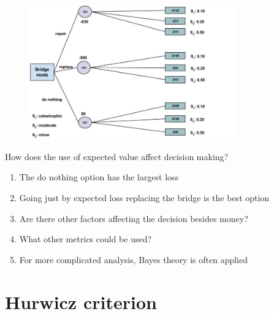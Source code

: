 \documentclass[aspectratio=1610,pdftex,dvipsnames,compress,xcolor={dvipsnames}]{beamer}
\begin{document}
\addtocounter{framenumber}{-1}
\begin{frame}{}
    \begin{figure}
        \centering
        \includegraphics[width=0.80\textwidth]{bridge.mods.expected.jpg}
    \end{figure}
\end{frame}


\begin{frame}{How does the use of expected value affect decision making?}
    \begin{enumerate}[series=outerlist,topsep=0pt,itemsep=21pt,leftmargin=*,label=(\arabic*)]
        \item[]The do nothing option has the largest loss
        \item[]Going just by expected loss replacing the bridge is the best option
        \item[]Are there other factors affecting the decision besides money? 
        \item[]What other metrics could be used?
        \item[]For more complicated analysis, Bayes theory is often applied
    \end{enumerate}
\end{frame}


\section{Hurwicz criterion}
\end{document}
